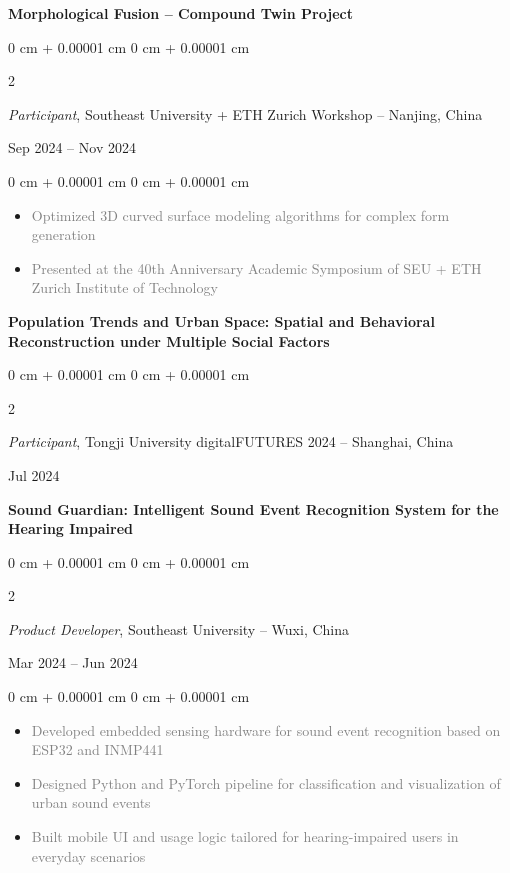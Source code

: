 \documentclass[10pt, letterpaper]{article}
\newenvironment{highlights}{
    \begin{itemize}[
        topsep=0.10 cm,
        parsep=0.10 cm,
        partopsep=0pt,
        itemsep=0pt,
        leftmargin=0 cm + 10pt
    ]
}{
    \end{itemize}
} %
\newenvironment{onecolentry}{
    \begin{adjustwidth}{
        0 cm + 0.00001 cm
    }{
        0 cm + 0.00001 cm
    }
}{
    \end{adjustwidth}
} %
\newenvironment{twocolentry}[2][]{
    \onecolentry
    \def\secondColumn{#2}
    \setcolumnwidth{\fill, 4.5 cm}
    \begin{paracol}{2}
}{
    \switchcolumn \raggedleft \secondColumn
    \end{paracol}
    \endonecolentry
} %
\begin{document}
    
    \vspace{0.2 cm}

    \textbf{Morphological Fusion -- Compound Twin Project} \\
    \begin{twocolentry}{
    Sep 2024 – Nov 2024
    }
    \textit{Participant}, Southeast University + ETH Zurich Workshop -- Nanjing, China
    \end{twocolentry}
    
    \vspace{0.10 cm}
    \begin{onecolentry}
    \begin{highlights}
        \item \textcolor{gray}{Optimized 3D curved surface modeling algorithms for complex form generation}
        \item \textcolor{gray}{Presented at the 40th Anniversary Academic Symposium of SEU + ETH Zurich Institute of Technology}
    \end{highlights}
    \end{onecolentry}


    \vspace{0.2 cm}

    
    \textbf{Population Trends and Urban Space: Spatial and Behavioral Reconstruction under Multiple Social Factors} \\
    \begin{twocolentry}{
    Jul 2024
    }
    \textit{Participant}, Tongji University digitalFUTURES 2024 -- Shanghai, China
    \end{twocolentry}
    
    \vspace{0.2 cm}

    \textbf{Sound Guardian: Intelligent Sound Event Recognition System for the Hearing Impaired} \\
    \begin{twocolentry}{
    Mar 2024 – Jun 2024
    }
    \textit{Product Developer}, Southeast University -- Wuxi, China
    \end{twocolentry}
    
    \vspace{0.10 cm}
    \begin{onecolentry}
    \begin{highlights}
        \item \textcolor{gray}{Developed embedded sensing hardware for sound event recognition based on ESP32 and INMP441}
        \item \textcolor{gray}{Designed Python and PyTorch pipeline for classification and visualization of urban sound events}
        \item \textcolor{gray}{Built mobile UI and usage logic tailored for hearing-impaired users in everyday scenarios}
    \end{highlights}
    \end{onecolentry}
    
\end{document}

